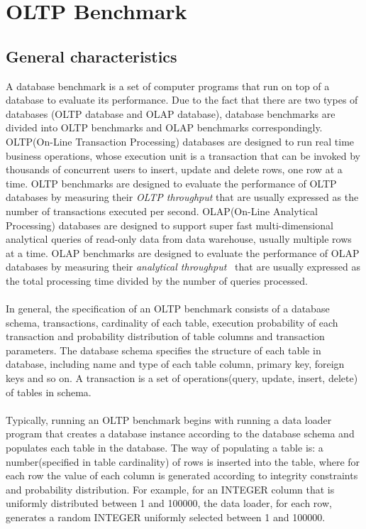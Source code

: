 \documentclass[a4paper,10pt]{article}
\begin{document}
\section{OLTP Benchmark}
\label{secBenchmark}
\subsection{General characteristics}
\label{secBenchmarkGeneral}
A database benchmark is a set of computer programs that run on top of a database to evaluate its performance. Due to the fact that there are two types of databases (OLTP database and OLAP database), database benchmarks are divided into OLTP benchmarks and OLAP benchmarks correspondingly. OLTP(On-Line Transaction Processing) databases are designed to run real time business operations, whose execution unit is a transaction that can be invoked by thousands of concurrent users to insert, update and delete rows, one row at a time. OLTP benchmarks are designed to evaluate the performance of OLTP databases by measuring their \emph{OLTP throughput} that are usually expressed as the number of transactions executed per second.  OLAP(On-Line Analytical Processing) databases are designed to support super fast multi-dimensional analytical queries of read-only data from data warehouse, usually multiple rows at a time. OLAP benchmarks are designed to evaluate the performance of OLAP databases by measuring their \emph{analytical throughput}~\cite{olapBenchmark} that are usually expressed as the total processing time divided by the number of queries processed. 
\\\\
In general, the specification of an OLTP benchmark consists of a database schema, transactions, cardinality of each table, execution probability of each transaction and probability distribution of table columns and transaction parameters. The database schema specifies the structure of each table in database, including name and type of each table column, primary key, foreign keys and so on. A transaction is a set of operations(query, update, insert, delete) of tables in schema. 
\\\\
Typically, running an OLTP benchmark begins with running a data loader program that creates a database instance according to the database schema and populates each table in the database. The way of populating a table is: a number(specified in table cardinality) of rows is inserted into the table, where for each row the value of each column is generated according to integrity constraints and probability distribution. For example, for an INTEGER column that is uniformly distributed between 1 and 100000, the data loader, for each row, generates a random INTEGER uniformly selected between 1 and 100000. 
\end{document}
